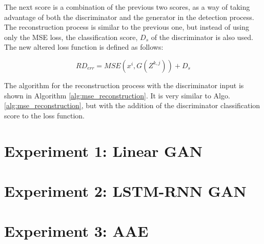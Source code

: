 The next score is a combination of the previous two scores, as a way of taking advantage of both the discriminator and the generator in the detection process. The reconstruction process is similar to the previous one, but instead of using only the MSE loss, the classification score, $D_{s}$ of the discriminator is also used. The new altered loss function is defined as follows:

\begin{equation}
    RD_{err} = MSE(x^i, G(Z^{k,j})) + D_{s}
\end{equation}

The algorithm for the reconstruction process with the discriminator input is shown in Algorithm \ref{alg:mse_reconstruction}. It is very similar to Algo. \ref{alg:mse_reconstruction}, but with the addition of the discriminator classification score to the loss function.
\\

\noindent{}

\section{Experiment 1: Linear GAN}\label{sec:gan_experiment_1}
\section{Experiment 2: LSTM-RNN GAN}\label{sec:gan_experiment_2}
\section{Experiment 3: AAE}\label{sec:gan_experiment_3}

